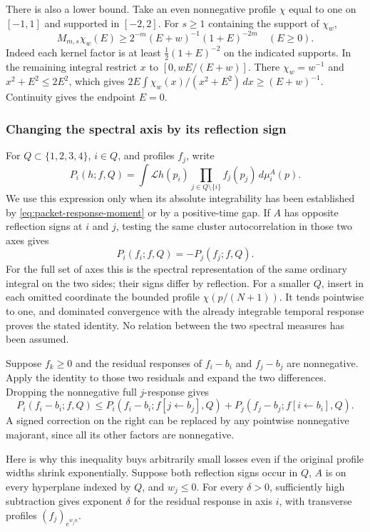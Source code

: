 There is also a lower bound. Take an even nonnegative profile $\chi$
equal to one on $[-1,1]$ and supported in $[-2,2]$. For $s\geq1$
containing the support of $\chi_w$,
\begin{equation}\label{eq:packet-response-floor}
 M_{m,s}\chi_w(E)\geq
 2^{-m}(E+w)^{-1}(1+E)^{-2m}\quad(E\geq0).
\end{equation}
Indeed each kernel factor is at least
$\tfrac12(1+E)^{-2}$ on the indicated supports. In the remaining integral
restrict $x$ to $[0,wE/(E+w)]$. There $\chi_w=w^{-1}$ and
$x^2+E^2\leq2E^2$, which gives
$2E\int\chi_w(x)/(x^2+E^2)\,dx\geq(E+w)^{-1}$.
Continuity gives the endpoint $E=0$.

\subsubsection{Changing the spectral axis by its reflection sign}

For $Q\subset\{1,2,3,4\}$, $i\in Q$, and profiles $f_j$, write
\[
 P_i(h;f,Q)=\int\mathcal Lh(p_i)
                   \prod_{j\in Q\setminus\{i\}}f_j(p_j)\,d\mu_i^A(p).
\]
We use this expression only when its absolute integrability has been
established by \eqref{eq:packet-response-moment} or by a positive-time gap.
If $A$ has opposite reflection signs at $i$ and $j$, testing the same
cluster autocorrelation in those two axes gives
\[
 P_i(f_i;f,Q)=-P_j(f_j;f,Q).
\]
For the full set of axes this is the spectral representation of the same
ordinary integral on the two sides; their signs differ by reflection.
For a smaller $Q$, insert in each omitted coordinate the bounded profile
$\chi(p/(N+1))$. It tends pointwise to one, and dominated convergence
with the already integrable temporal response proves the stated identity.
No relation between the two spectral measures has been assumed.

Suppose $f_k\geq0$ and the residual responses of $f_i-b_i$ and $f_j-b_j$
are nonnegative. Apply the identity to those two residuals and expand the
two differences. Dropping the nonnegative full $j$-response gives
\begin{equation}\label{eq:packet-axis-alternation}
 P_i(f_i-b_i;f,Q)\leq
 P_i(f_i-b_i;f[j\leftarrow b_j],Q)
 +P_j(f_j-b_j;f[i\leftarrow b_i],Q).
\end{equation}
A signed correction on the right can be replaced by any pointwise
nonnegative majorant, since all its other factors are nonnegative.

Here is why this inequality buys arbitrarily small losses even if the
original profile widths shrink exponentially. Suppose both reflection
signs occur in $Q$, $A$ is on every hyperplane indexed by $Q$, and
$w_j\leq0$. For every $\delta>0$, sufficiently high subtraction gives
exponent $\delta$ for the residual response in axis $i$, with transverse
profiles $(f_j)_{e^{w_jn}}$.


